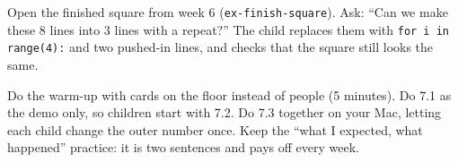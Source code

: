 \begin{stretchchallenge}
Open the finished square from week 6 (\texttt{ex-finish-square}). Ask: \enquote{Can we make these 8 lines into 3 lines with a repeat?} The child replaces them with \texttt{for i in range(4):} and two pushed-in lines, and checks that the square still looks the same.
\end{stretchchallenge}

\begin{teachernote}
Do the warm-up with cards on the floor instead of people (5 minutes). Do 7.1 as the demo only, so children start with 7.2. Do 7.3 together on your Mac, letting each child change the outer number once. Keep the \enquote{what I expected, what happened} practice: it is two sentences and pays off every week.
\end{teachernote}
